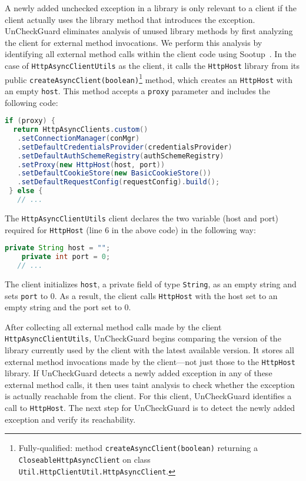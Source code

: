 A newly added unchecked exception in a library is only relevant to a client if the client actually uses the library method that introduces the exception. UnCheckGuard eliminates analysis of unused library methods by first analyzing the client for external method invocations. We perform this analysis by identifying all external method calls within the client code using Sootup~\cite{Karakaya24:_sootup}. In the case of \texttt{HttpAsyncClientUtils} as the client, it calls the \texttt{HttpHost} library from its public \texttt{createAsyncClient(boolean)}\footnote{Fully-qualified: method \texttt{createAsyncClient(boolean)} returning a \texttt{CloseableHttpAsyncClient} on class \texttt{Util.HttpClientUtil.HttpAsyncClient}.} method, which creates an \texttt{HttpHost} with an empty \texttt{host}. This method accepts a \texttt{proxy} parameter and includes the following code:

\begin{lstlisting}[language=Java]
 if (proxy) {
  return HttpAsyncClients.custom()
   .setConnectionManager(conMgr)
   .setDefaultCredentialsProvider(credentialsProvider)
   .setDefaultAuthSchemeRegistry(authSchemeRegistry)
   .setProxy(new HttpHost(host, port))
   .setDefaultCookieStore(new BasicCookieStore())
   .setDefaultRequestConfig(requestConfig).build();
 } else {
   // ...
\end{lstlisting}

The \texttt{HttpAsyncClientUtils} client declares the two variable (host and port) required for \texttt{HttpHost} (line 6 in the above code) in the following way:
\begin{lstlisting}[language=Java]
    private String host = "";
    private int port = 0;
   // ...
\end{lstlisting}

The client initializes \texttt{host}, a private field of type \texttt{String}, as an empty string and sets \texttt{port} to 0. As a result, the client calls \texttt{HttpHost} with the host set to an empty string and the port set to 0.

After collecting all external method calls made by the client \texttt{HttpAsyncClientUtils}, UnCheckGuard begins comparing the version of the library currently used by the client with the latest available version. It stores all external method invocations made by the client—not just those to the \texttt{HttpHost} library. If UnCheckGuard detects a newly added exception in any of these external method calls, it then uses taint analysis to check whether the exception is actually reachable from the client. For this client, UnCheckGuard identifies a call to \texttt{HttpHost}. The next step for UnCheckGuard is to detect the newly added exception and verify its reachability.


